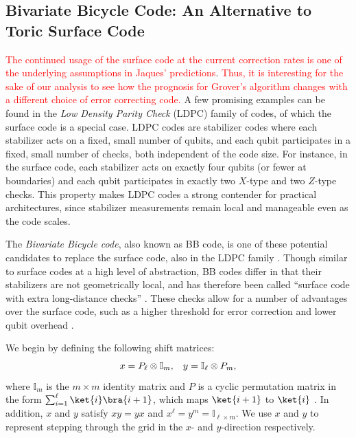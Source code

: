\subsection{Bivariate Bicycle Code: An Alternative to Toric Surface Code}
\textcolor{red}{The continued usage of the surface code at the current correction rates is one of the underlying assumptions in Jaques' predictions}. 
\textcolor{red}{Thus, it is interesting for the sake of our analysis to see how the prognosis for Grover's algorithm changes with a different choice of error correcting code. }A few promising examples can be found in the \emph{Low Density Parity Check} (LDPC) family of codes, of which the surface code is a special case. LDPC codes are stabilizer codes where each stabilizer acts on a fixed, small number of qubits, and each qubit participates in a fixed, small number of checks, both independent of the code size. For instance, in the surface code, each stabilizer acts on exactly four qubits (or fewer at boundaries) and each qubit participates in exactly two $X$-type and two $Z$-type checks. This property makes LDPC codes a strong contender for practical architectures, since stabilizer measurements remain local and manageable even as the code scales. 

The \emph{Bivariate Bicycle code}, also known as BB code, is one of these potential candidates to replace the surface code, also in the LDPC family \cite{Bravyi2024}. Though similar to surface codes at a high level of abstraction, BB codes differ in that their stabilizers are not geometrically local, and has therefore been called ``surface code with extra long-distance checks'' \cite{sommerstudentNSM}. These checks allow for a number of advantages over the surface code, such as a higher threshold for error correction and lower qubit overhead \cite{Bravyi2024}. 

We begin by defining the following shift matrices:
\[x = P_{\ell} \otimes \mathbb{I}_m, \hspace{0.3cm} y = \mathbb{I}_{\ell} \otimes P_{m},\]
where $\mathbb{I}_m$ is the $m \times m$ identity matrix and $P$ is a cyclic permutation matrix in the form $\sum_{i=1}^{\ell} \ket{i}\bra{i+1}$, which maps $\ket{i+1}$ to $\ket{i}$ \cite{sommerstudentNSM}. In addition, $x$ and $y$ satisfy $xy = yx$ and $x^{\ell} = y^m = \mathbb{I}_{\ell \times m}$. We use $x$ and $y$ to represent stepping through the grid in the $x$- and $y$-direction respectively.

